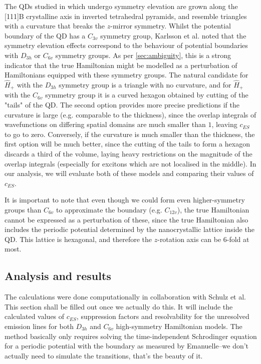 \documentclass[12pt]{article}
\begin{document}
	The QDs studied in \cite{karlsson} which undergo symmetry elevation are grown along the [111]B crystalline axis in inverted tetrahedral pyramids, and resemble triangles with a curvature that breaks the $z$-mirror symmetry. Whilst the potential boundary of the QD has a $C_{3v}$ symmetry group, Karlsson et al. noted that the symmetry elevation effects correspond to the behaviour of potential boundaries with $D_{3h}$ or $C_{6v}$ symmetry groups. As per \ref{sec:ambiguity}, this is a strong indicator that the true Hamiltonian might be modelled as a perturbation of Hamiltonians equipped with these symmetry groups. The natural candidate for $\hat{H}_+$ with the $D_{3h}$ symmetry group is a triangle with no curvature, and for $\hat{H}_+$ with the $C_{6v}$ symmetry group it is a curved hexagon obtained by cutting of the "tails" of the QD. The second option provides more precise predictions if the curvature is large (e.g. comparable to the thickness), since the overlap integrals of wavefunctions on differing spatial domains are much smaller than $1$, leaving $c_{ES}$ to go to zero. Conversely, if the curvature is much smaller than the thickness, the first option will be much better, since the cutting of the tails to form a hexagon discards a third of the volume, laying heavy restrictions on the magnitude of the overlap integrals (especially for excitons which are not localised in the middle). In our analysis, we will evaluate both of these models and comparing their values of $c_{ES}$.
	
	It is important to note that even though we could form even higher-symmetry groups than $C_{6v}$ to approximate the boundary (e.g. $C_{12v}$), the true Hamiltonian cannot be expressed as a perturbation of these, since the true Hamiltonian also includes the periodic potential determined by the nanocrystallic lattice inside the QD. This lattice is hexagonal, and therefore the $z$-rotation axis can be $6$-fold at most.
	
	\subsection{Analysis and results}
	
	The calculations were done computationally in collaboration with Schulz et al. This section shall be filled out once we actually do this. It will include the calculated values of $c_{ES}$, suppression factors and resolvability for the unresolved emission lines for both $D_{3h}$ and $C_{6v}$ high-symmetry Hamiltonian models. The method basically only requires solving the time-independent Schrodinger equation for a periodic potential with the boundary as measured by Emanuelle--we don't actually need to simulate the transitions, that's the beauty of it.
	
\end{document}
